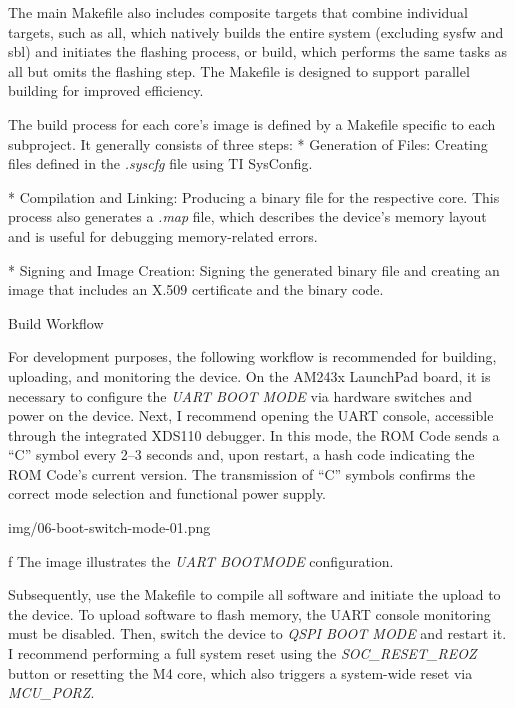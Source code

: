The main Makefile also includes composite targets that combine individual targets, such as {\sbf all}, which natively builds the entire system (excluding sysfw and sbl) and initiates the flashing process, or {\sbf build}, which performs the same tasks as {\sbf all} but omits the flashing step. The Makefile is designed to support parallel building for improved efficiency.

The build process for each core’s image is defined by a Makefile specific to each subproject. It generally consists of three steps:
\begitems
* {\sbf Generation of Files}: Creating files defined in the {\it .syscfg} file using TI SysConfig.

* {\sbf Compilation and Linking}: Producing a binary file for the respective core. This process also generates a {\it .map} file, which describes the device’s memory layout and is useful for debugging memory-related errors.

* {\sbf Signing and Image Creation}: Signing the generated binary file and creating an image that includes an X.509 certificate and the binary code.

\enditems

\secc Build Workflow

For development purposes, the following workflow is recommended for building, uploading, and monitoring the device. On the AM243x LaunchPad board, it is necessary to configure the {\it UART BOOT MODE} via hardware switches and power on the device. Next, I recommend opening the UART console, accessible through the integrated XDS110 debugger. In this mode, the ROM Code sends a “C” symbol every 2–3 seconds and, upon restart, a hash code indicating the ROM Code’s current version. The transmission of “C” symbols confirms the correct mode selection and functional power supply.

\medskip
{}
\picw=6cm \cinspic img/06-boot-switch-mode-01.png
\caption/f The image illustrates the {\it UART BOOTMODE} configuration.
\medskip

Subsequently, use the Makefile to compile all software and initiate the upload to the device. To upload software to flash memory, the UART console monitoring must be disabled. Then, switch the device to {\it QSPI BOOT MODE} and restart it. I recommend performing a full system reset using the {\it SOC_RESET_REOZ} button or resetting the M4 core, which also triggers a system-wide reset via {\it MCU_PORZ}.

